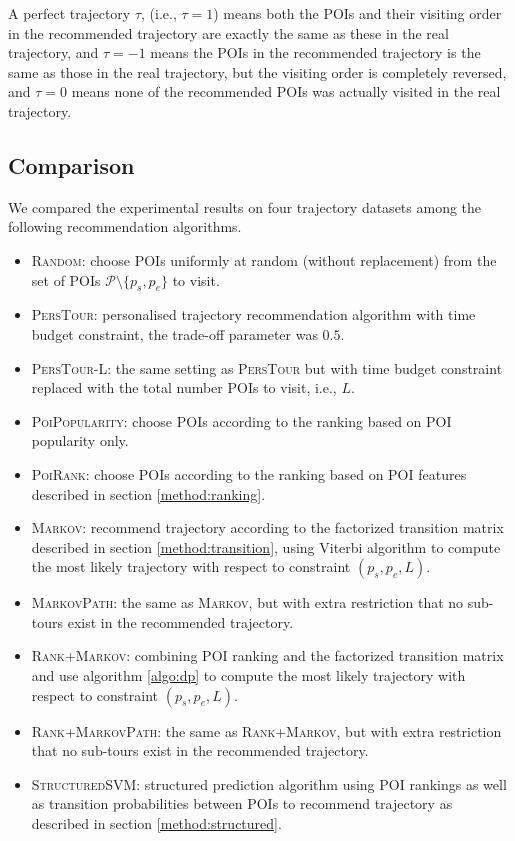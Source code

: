A perfect trajectory $\tau$, (i.e., $\tau = 1$) means both the POIs and their visiting order in the 
recommended trajectory are exactly the same as these in the real trajectory,
and $\tau = -1$ means the POIs in the recommended trajectory is the same as those in the real trajectory,
but the visiting order is completely reversed,
and $\tau = 0$ means none of the recommended POIs was actually visited in the real trajectory.


\subsection{Comparison}
\label{experiment:comparison}

We compared the experimental results on four trajectory datasets among the following recommendation algorithms.
\begin{itemize}
\item \textsc{Random}: choose POIs uniformly at random (without replacement) 
      from the set of POIs $\mathcal{P} \setminus \{p_s, p_e \}$ to visit.
\item \textsc{PersTour}\cite{ijcai15}: personalised trajectory recommendation algorithm with time budget constraint,
      the trade-off parameter was $0.5$.
\item \textsc{PersTour-L}: the same setting as \textsc{PersTour} but with time budget constraint replaced with the 
      total number POIs to visit, i.e., $L$.
\item \textsc{PoiPopularity}: choose POIs according to the ranking based on POI popularity only.
\item \textsc{PoiRank}: choose POIs according to the ranking based on POI features described in section \ref{method:ranking}.
\item \textsc{Markov}: recommend trajectory according to the factorized transition matrix described in section \ref{method:transition},
      using Viterbi algorithm to compute the most likely trajectory with respect to constraint $(p_s, p_e, L)$.
\item \textsc{MarkovPath}: the same as \textsc{Markov}, but with extra restriction that 
      no sub-tours exist in the recommended trajectory.
\item \textsc{Rank+Markov}: combining POI ranking and the factorized transition matrix and use algorithm \ref{algo:dp} to 
      compute the most likely trajectory with respect to constraint $(p_s, p_e, L)$.
\item \textsc{Rank+MarkovPath}: the same as \textsc{Rank+Markov}, but with extra restriction that 
      no sub-tours exist in the recommended trajectory.
\item \textsc{StructuredSVM}: structured prediction algorithm using POI rankings as well as transition probabilities
      between POIs to recommend trajectory as described in section \ref{method:structured}.
\end{itemize}

